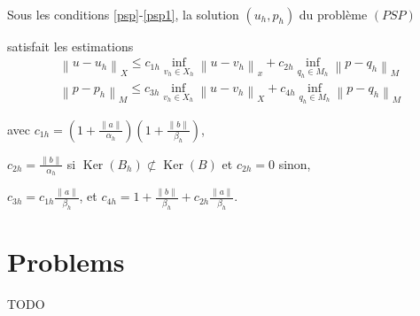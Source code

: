  
\begin{proposition}\
	


Sous les conditions \eqref{psp}-\eqref{psp1}, la solution $\left(u_{h}, p_{h}\right)$ du problème $(PSP)$   

satisfait les estimations
 $$
 \begin{array}{l}
 	\left\|u-u_{h}\right\|_{X} \leq c_{1 h} \inf _{v_{h} \in X_{h}}\left\|u-v_{h}\right\|_{x}+c_{2 h} \inf _{q_{h} \in M_{h}}\left\|p-q_{h}\right\|_{M} \\
 	\left\|p-p_{h}\right\|_{M} \leq c_{3 h} \inf _{v_{h} \in X_{h}}\left\|u-v_{h}\right\|_{X}+c_{4 h} \inf _{q_{h} \in M_{h}}\left\|p-q_{h}\right\|_{M}
 \end{array}
 $$
 
 avec  $c_{1 h}=\left(1+\frac{\|a\|}{\alpha_{h}}\right)\left(1+\frac{\|b\|}{\beta_{h}}\right)$, \
 
 $c_{2 h}=\frac{\|b\|}{\alpha_{h}}$  si  
 $\operatorname{Ker}\left(B_{h}\right) \not \subset \operatorname{Ker}(B)$ et  $c_{2 h}=0$ sinon, \
 
 $c_{3 h}=c_{1 h} \frac{\|a\|}{\beta_{h}}$, et  $c_{4 h}=1+\frac{\|b\|}{\beta_{h}}+c_{2 h} \frac{\|a\|}{\beta_{h}}$.


\end{proposition}






\section{Problems}

\begin{exercise}
  TODO
\end{exercise}


